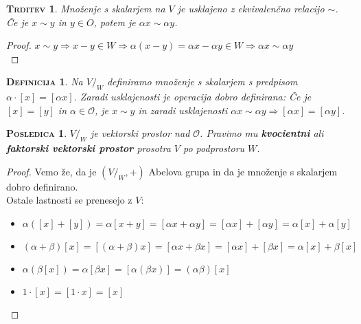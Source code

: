 \documentclass[a4paper,12pt]{article}
\newcommand{\OO}{\mathcal{O}}
\newtheorem*{trditev}{\textsc{Trditev}}
\newtheorem*{posledica}{\textsc{Posledica}}
\newtheorem*{definicija}{\textsc{Definicija}}
\begin{document}
\begin{trditev}
Množenje s skalarjem na $V$ je usklajeno z ekvivalenčno relacijo $\sim$. Če je $x\sim y$ in $y\in O$, potem je $\alpha x \sim \alpha y$.\\
\end{trditev}

\begin{proof} 
	$x\sim y \Rightarrow x-y\in W \Rightarrow \alpha(x-y)=\alpha x-\alpha y\in W \Rightarrow \alpha x \sim \alpha y$ \\
\end{proof}

\begin{definicija}
	Na $V/_W$ definiramo množenje s skalarjem s predpisom $\alpha \cdot [x]=[\alpha x]$. Zaradi usklajenosti je operacija dobro definirana: Če je $[x]=[y]$ in $\alpha  \in \OO$, je $x\sim y$ in zaradi usklajenosti $\alpha x \sim \alpha y \Rightarrow [\alpha x] = [\alpha y]$. \\
\end{definicija}

\begin{posledica}
	$V/_W$ je vektorski prostor nad $\mathcal{O}$. Pravimo mu \textbf{kvocientni} ali \linebreak  \textbf{faktorski vektorski prostor} prosotra $V$ po podprostoru $W$.\\
\end{posledica}

\begin{proof}
	Vemo že, da je $(V/_W,+)$ Abelova grupa in da je množenje s skalarjem dobro  \linebreak definirano. \\

	Ostale lastnosti se prenesejo z $V$:\\
	
	\begin{itemize}
		\item $\alpha([x]+[y])=\alpha [x+y]=[\alpha x + \alpha y]=[\alpha x]+[\alpha y]=\alpha[x] + \alpha [y]$
		\item $(\alpha + \beta)[x] = [(\alpha + \beta)x]=[\alpha x + \beta x]=[\alpha x]+[\beta x]=\alpha[x]+\beta[x]$
		\item $\alpha(\beta[x])=\alpha[\beta x]=[\alpha(\beta x)]=(\alpha \beta)[x]$
		\item $1\cdot [x]=[1\cdot x]=[x]$ \\
	\end{itemize}
\end{proof}
\end{document}
